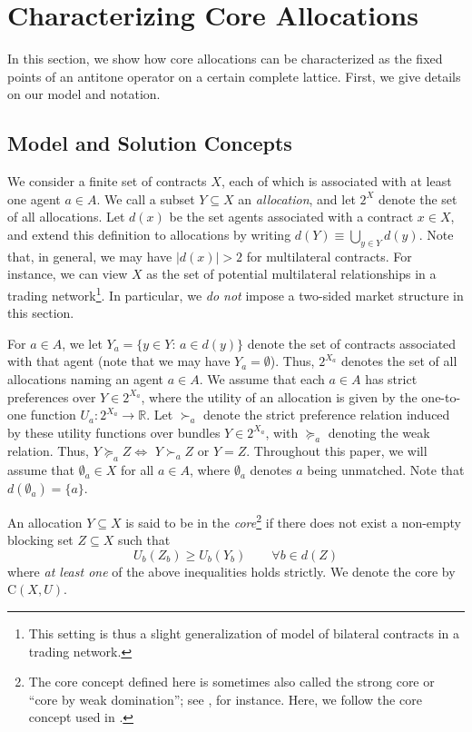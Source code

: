 \documentclass[11pt,reqno]{amsart}
\theoremstyle{definition}
\numberwithin{equation}{section}
\newcommand{\mr}{\mathbb{R}}
\newcommand{\sub}{\subseteq}
\newcommand{\strcore}{\mathrm{C}(X,U)}
\newcommand{\suq}{\succeq}
\newcommand{\su}{\succ}
\begin{document}
\section{Characterizing Core Allocations} \label{section:strcore}
In this section, we show how core allocations can be characterized as the fixed points of an antitone operator on a certain complete lattice.
First, we give details on our model and notation.

\subsection{Model and Solution Concepts}
We consider a finite set of contracts $X$, each of which is associated with at least one agent $a\in A$. 
We call a subset $Y\sub X$ an \emph{allocation}, and let $2^X$ denote the set of all allocations. 
Let $d(x)$ be the set agents associated with a contract $x\in X$, and extend this definition to allocations by writing $d(Y) \equiv \bigcup_{y\in Y} d(y)$.
Note that, in general, we may have $|d(x)| > 2$ for multilateral contracts.
For instance, we can view $X$ as the set of potential multilateral relationships in a trading network\footnote{This setting is thus a slight generalization of \cite{HatfieldKominers2010} model of bilateral contracts in a trading network.}. 
In particular, we \emph{do not} impose a two-sided market structure in this section.

For $a\in A$, we let $Y_a = \{y\in Y: \, a\in d(y)\}$ denote the set of contracts associated with that agent (note that we may have $Y_a = \emptyset$). Thus, $2^{X_a}$ denotes the set of all allocations naming an agent $a\in A$. 
We assume that each $a\in A$ has strict preferences over $Y \in 2^{X_a}$, where the utility of an allocation is given by the one-to-one function $U_a: 2^{X_a} \to \mr$.
Let $\su_a$ denote the strict preference relation induced by these utility functions over bundles $Y \in 2^{X_a}$, with $\suq_a$ denoting the weak relation. Thus, $Y \suq_a  Z \iff$ $Y \su_a Z$ or $Y = Z$.
Throughout this paper, we will assume that $\emptyset_a \in X$ for all $a \in A$, where $\emptyset_a$ denotes $a$ being unmatched. Note that $d(\emptyset_a) = \{a\}$. 

An allocation $Y \sub X$ is said to be in the \emph{core}\footnote{The core concept defined here is sometimes also called the strong core or ``core by weak domination''; see \cite{RothSotomayor1996}, for instance.
Here, we follow the core concept used in \cite{EcheniqueYenmez2013}.}
if there does not exist a non-empty blocking set $Z \sub X$ such that 
\[
U_b(Z_b) \geq U_b(Y_b) \qquad  \forall b\in d(Z)
\]
where \emph{at least one} of the above inequalities holds strictly.
We denote the core by $\strcore$. 
\end{document}
